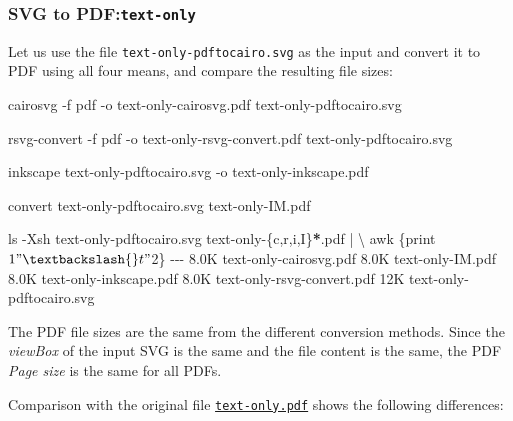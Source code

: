 \documentclass[
  11pt,
  british,
  a4paper,
]{article}
\newenvironment{Shaded}{\begin{snugshade}}{\end{snugshade}}
\newcommand{\AttributeTok}[1]{\textcolor[rgb]{0.80,0.80,0.80}{#1}}
\newcommand{\DataTypeTok}[1]{\textcolor[rgb]{0.87,0.87,0.75}{#1}}
\newcommand{\ExtensionTok}[1]{\textcolor[rgb]{0.80,0.80,0.80}{#1}}
\newcommand{\FunctionTok}[1]{\textcolor[rgb]{0.94,0.94,0.56}{#1}}
\newcommand{\KeywordTok}[1]{\textcolor[rgb]{0.94,0.87,0.69}{#1}}
\newcommand{\NormalTok}[1]{\textcolor[rgb]{0.80,0.80,0.80}{#1}}
\newcommand{\OperatorTok}[1]{\textcolor[rgb]{0.94,0.94,0.82}{#1}}
\newcommand{\PreprocessorTok}[1]{\textcolor[rgb]{1.00,0.81,0.69}{\textbf{#1}}}
\newcommand{\StringTok}[1]{\textcolor[rgb]{0.80,0.58,0.58}{#1}}
\begin{document}
\hypertarget{svg-to-pdftext-only}{%
\subsubsection{\texorpdfstring{SVG to
PDF:\texttt{text-only}}{SVG to PDF:text-only}}\label{svg-to-pdftext-only}}

Let us use the file \texttt{text-only-pdftocairo.svg} as the input and
convert it to PDF using all four means, and compare the resulting file
sizes:

\begin{Shaded}
\begin{Highlighting}[]
\ExtensionTok{cairosvg} \AttributeTok{{-}f}\NormalTok{ pdf }\AttributeTok{{-}o}\NormalTok{ text{-}only{-}cairosvg.pdf text{-}only{-}pdftocairo.svg}

\ExtensionTok{rsvg{-}convert} \AttributeTok{{-}f}\NormalTok{ pdf }\AttributeTok{{-}o}\NormalTok{ text{-}only{-}rsvg{-}convert.pdf text{-}only{-}pdftocairo.svg}

\ExtensionTok{inkscape}\NormalTok{ text{-}only{-}pdftocairo.svg }\AttributeTok{{-}o}\NormalTok{ text{-}only{-}inkscape.pdf}

\ExtensionTok{convert}\NormalTok{ text{-}only{-}pdftocairo.svg text{-}only{-}IM.pdf}

\FunctionTok{ls} \AttributeTok{{-}Xsh}\NormalTok{ text{-}only{-}pdftocairo.svg text{-}only{-}}\DataTypeTok{\{c}\OperatorTok{,}\DataTypeTok{r}\OperatorTok{,}\DataTypeTok{i}\OperatorTok{,}\DataTypeTok{I\}}\PreprocessorTok{*}\NormalTok{.pdf }\KeywordTok{|} \DataTypeTok{\textbackslash{}}
\FunctionTok{awk} \StringTok{\textquotesingle{}\{print $1 "\textbackslash{}t" $2\}\textquotesingle{}}
\ExtensionTok{{-}{-}{-}}
\ExtensionTok{8.0K}\NormalTok{    text{-}only{-}cairosvg.pdf}
\ExtensionTok{8.0K}\NormalTok{    text{-}only{-}IM.pdf}
\ExtensionTok{8.0K}\NormalTok{    text{-}only{-}inkscape.pdf}
\ExtensionTok{8.0K}\NormalTok{    text{-}only{-}rsvg{-}convert.pdf}
\ExtensionTok{12K}\NormalTok{     text{-}only{-}pdftocairo.svg}
\end{Highlighting}
\end{Shaded}

The PDF file sizes are the same from the different conversion methods.
Since the \emph{viewBox} of the input SVG is the same and the file
content is the same, the PDF \emph{Page size} is the same for all PDFs.

Comparison with the original file
\href{images/text-only.pdf}{\texttt{text-only.pdf}} shows the following
differences:
\end{document}

